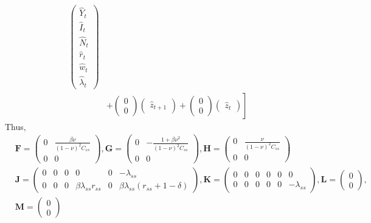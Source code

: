 \documentclass[11pt]{article}
\numberwithin{equation}{section} %
\numberwithin{figure}{section} %
\numberwithin{table}{section} %
\theoremstyle{definition}
\begin{document}
\begin{align*}
\begin{pmatrix}
        \hat{Y}_t \\
        \hat{I}_t \\
        \hat{N}_t \\
        \hat{r}_t \\
        \hat{w}_t \\
        \hat{\lambda}_t
    \end{pmatrix} \\
    &+ \left.\begin{pmatrix}
        0 \\ 0
    \end{pmatrix} \begin{pmatrix}
        \hat{z}_{t+1}
    \end{pmatrix} + \begin{pmatrix}
        0 \\ 0
    \end{pmatrix} \begin{pmatrix}
        \hat{z}_t
    \end{pmatrix} \right]
\end{align*}
Thus,
\begin{align*}
    &\mathbf{F} = \begin{pmatrix}
        0 & \frac{\beta \nu}{(1 - \nu)^2 C_{ss}} \\
        0 & 0
    \end{pmatrix}, \mathbf{G} = \begin{pmatrix}
        0 & -\frac{1 + \beta \nu^2}{(1 - \nu)^2 C_{ss}} \\
        0 & 0
    \end{pmatrix}, \mathbf{H} = \begin{pmatrix}
        0 & \frac{\nu}{(1 - \nu)^2 C_{ss}} \\
        0 & 0
    \end{pmatrix} \\
    &\mathbf{J} = \begin{pmatrix}
        0 & 0 & 0 & 0 & 0 & -\lambda_{ss} \\
        0 & 0 & 0 & \beta \lambda_{ss} r_{ss} & 0 & \beta \lambda_{ss} (r_{ss} + 1 - \delta)
    \end{pmatrix}, \mathbf{K} = \begin{pmatrix}
        0 & 0 & 0 & 0 & 0 & 0 \\
        0 & 0 & 0 & 0 & 0 & -\lambda_{ss}
    \end{pmatrix}, \mathbf{L} = \begin{pmatrix}
        0 \\ 0
    \end{pmatrix}, \\
    &\mathbf{M} = \begin{pmatrix}
        0 \\ 0
    \end{pmatrix}
\end{align*}
\end{document}
